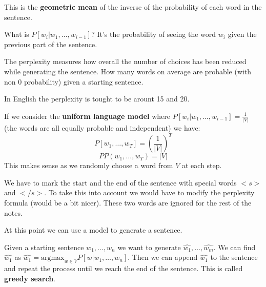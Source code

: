 This is the \textbf{geometric mean} of the inverse of the probability of each word in the sentence.

What is $P[w_i|w_1,\dots,w_{i-1}]$? It's the probability of seeing
the word $w_i$ given the previous part of the sentence.

The perplexity measures how overall the number of choices has been reduced
while generating the sentence. How many words on average are
probable (with non 0 probability) given a starting sentence.

In English the perplexity is tought to be arount 15 and 20.

If we consider the \textbf{uniform language model} where $P[w_i|w_1,\dots,w_{i-1}]=\frac{1}{|V|}$ 
(the words are all equally probable and independent) we have:
\[
    P[w_1,\dots,w_T]=\left(\frac{1}{|V|}\right)^T
\]
\[
    PP(w_1,\dots,w_T)=|V|
\]
This makes sense as we randomly choose a word from $V$ at each step.

We have to mark the start and the end of the sentence with special words $<s>$ and $</s>$.
To take this into account we would have to modify the perplexity formula (would be a bit nicer).
These two words are ignored for the rest of the notes.

At this point we can use a model to generate a sentence.

Given a starting sentence $w_1,\dots,w_n$ we want to generate $\hat{w_1},\dots,\hat{w_m}$.
We can find $\hat{w_1}$ as $\hat{w_1}=\text{argmax}_{w\in V}P[w|w_1,\dots,w_n]$.
Then we can append $\hat{w_1}$ to the sentence and repeat the process until we reach the end of the sentence.
This is called \textbf{greedy search}.
